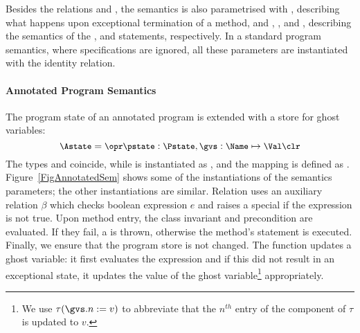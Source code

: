 Besides the relations \gammain and \gammanorm, the semantics
is also parametrised with
\gammaexc, describing what happens upon exceptional termination of a
method, and \deltaset, \deltacase, and \deltaassert, describing the
semantics of the \Set, \CaseJML and \Assert statements,
respectively. In a standard program semantics, where specifications
are ignored, all these parameters are instantiated %
with the identity relation.



\paragraph{Annotated Program Semantics}

The program state of an annotated program is extended with a store for
ghost variables:
\[{\small
\Astate = \opr \pstate : \Pstate, \gvs : \Name \mapsto \Val \clr}
\]
The types \FullProgram and \Program coincide, while \FullState is
instantiated as \Astate, and the mapping \progstate is defined as
\pstate. Figure~\ref{FigAnnotatedSem} shows some of the
instantiations of the semantics parameters; %
the other instantiations are similar. Relation \gammain uses an
auxiliary relation \(\beta\) which checks boolean expression \(e\) and
raises a special \JMLExc if the expression is not true. Upon method
entry, the class invariant and precondition are evaluated. If they
fail, a \JMLExc is thrown, otherwise the method's \preset statement is
executed. Finally, we ensure that the program store is not
changed. The function
\deltaset updates a ghost variable: it first evaluates the expression
and if this did not result in an exceptional state, it updates the
value of the ghost variable\footnote{We use \(\tau(\gvs.n := v)\) to
abbreviate that the \(n^{th}\) entry of the \gvs component of \(\tau\) is
updated to \(v\).} appropriately.

